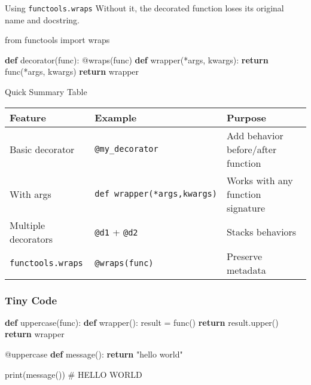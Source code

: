 \documentclass[
  letterpaper,
  DIV=11,
  numbers=noendperiod]{scrreprt}
\newenvironment{Shaded}{\begin{snugshade}}{\end{snugshade}}
\newcommand{\AttributeTok}[1]{\textcolor[rgb]{0.40,0.45,0.13}{#1}}
\newcommand{\BuiltInTok}[1]{\textcolor[rgb]{0.00,0.23,0.31}{#1}}
\newcommand{\CommentTok}[1]{\textcolor[rgb]{0.37,0.37,0.37}{#1}}
\newcommand{\ControlFlowTok}[1]{\textcolor[rgb]{0.00,0.23,0.31}{\textbf{#1}}}
\newcommand{\ImportTok}[1]{\textcolor[rgb]{0.00,0.46,0.62}{#1}}
\newcommand{\KeywordTok}[1]{\textcolor[rgb]{0.00,0.23,0.31}{\textbf{#1}}}
\newcommand{\NormalTok}[1]{\textcolor[rgb]{0.00,0.23,0.31}{#1}}
\newcommand{\OperatorTok}[1]{\textcolor[rgb]{0.37,0.37,0.37}{#1}}
\newcommand{\StringTok}[1]{\textcolor[rgb]{0.13,0.47,0.30}{#1}}
\begin{document}
Using \texttt{functools.wraps} Without it, the decorated function loses
its original name and docstring.

\begin{Shaded}
\begin{Highlighting}[]
\ImportTok{from}\NormalTok{ functools }\ImportTok{import}\NormalTok{ wraps}

\KeywordTok{def}\NormalTok{ decorator(func):}
    \AttributeTok{@wraps}\NormalTok{(func)}
    \KeywordTok{def}\NormalTok{ wrapper(}\OperatorTok{*}\NormalTok{args, kwargs):}
        \ControlFlowTok{return}\NormalTok{ func(}\OperatorTok{*}\NormalTok{args, kwargs)}
    \ControlFlowTok{return}\NormalTok{ wrapper}
\end{Highlighting}
\end{Shaded}

Quick Summary Table

\begin{longtable}[]{@{}
  >{\raggedright\arraybackslash}p{}
  >{\raggedright\arraybackslash}p{}
  >{\raggedright\arraybackslash}p{}@{}}
\toprule\noalign{}
\begin{minipage}[b]{\linewidth}\raggedright
Feature
\end{minipage} & \begin{minipage}[b]{\linewidth}\raggedright
Example
\end{minipage} & \begin{minipage}[b]{\linewidth}\raggedright
Purpose
\end{minipage} \\
\midrule\noalign{}
\endhead
\bottomrule\noalign{}
\endlastfoot
Basic decorator & \texttt{@my\_decorator} & Add behavior before/after
function \\
With args & \texttt{def\ wrapper(*args,kwargs)} & Works with any
function signature \\
Multiple decorators & \texttt{@d1} + \texttt{@d2} & Stacks behaviors \\
\texttt{functools.wraps} & \texttt{@wraps(func)} & Preserve metadata \\
\end{longtable}

\subsubsection{Tiny Code}\label{tiny-code-85}

\begin{Shaded}
\begin{Highlighting}[]
\KeywordTok{def}\NormalTok{ uppercase(func):}
    \KeywordTok{def}\NormalTok{ wrapper():}
\NormalTok{        result }\OperatorTok{=}\NormalTok{ func()}
        \ControlFlowTok{return}\NormalTok{ result.upper()}
    \ControlFlowTok{return}\NormalTok{ wrapper}

\AttributeTok{@uppercase}
\KeywordTok{def}\NormalTok{ message():}
    \ControlFlowTok{return} \StringTok{"hello world"}

\BuiltInTok{print}\NormalTok{(message())   }\CommentTok{\# HELLO WORLD}
\end{Highlighting}
\end{Shaded}
\end{document}
